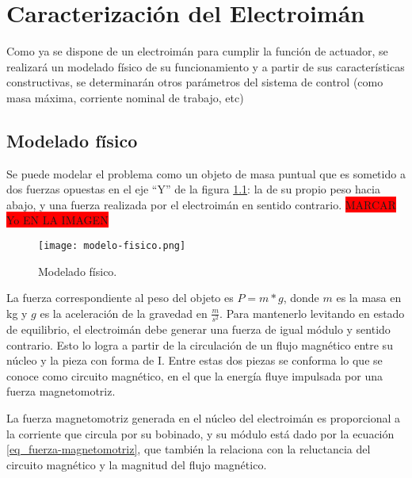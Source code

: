 \chapter{Caracterización del  Electroimán}  \label{cap:CaracterizaciónElectroimán}

\noindent  Como ya se dispone de un electroimán para cumplir la función de actuador, se realizará un modelado físico de su funcionamiento y a partir de sus características constructivas, se determinarán otros parámetros del sistema de control (como masa máxima, corriente nominal de trabajo, etc)


\section{Modelado físico}




\noindent Se puede modelar el problema como un objeto de masa puntual que es sometido a dos fuerzas opuestas en el eje “Y” de la figura \ref{fig:img_modelado-fisico}: la de su propio peso hacia abajo, y una fuerza realizada por el electroimán en sentido contrario. \colorbox{red}{MARCAR Yo EN LA IMAGEN}

\begin{figure}[H]
	\centering
	\texttt{[image: modelo-fisico.png]}
	\caption{Modelado físico.}
	\label{fig:img_modelado-fisico}
\end{figure}

\noindent La fuerza correspondiente al peso del objeto es $P=m*g$, donde $m$ es la masa en kg y $g$ es la aceleración de la gravedad en $\frac{m}{s^{2}}$. Para mantenerlo levitando en estado de equilibrio, el electroimán debe generar una fuerza de igual módulo y sentido contrario. Esto lo logra a partir de la circulación de un flujo magnético entre su núcleo y la pieza con forma de I. Entre estas dos piezas se conforma lo que se conoce como circuito magnético, en el que la energía fluye impulsada por una fuerza magnetomotriz.

\noindent La fuerza magnetomotriz generada en el núcleo del electroimán es proporcional a la corriente que circula por su bobinado, y su módulo está dado por la ecuación \ref{eq_fuerza-magnetomotriz}, que también la relaciona con la reluctancia del circuito magnético y la magnitud del flujo magnético.

